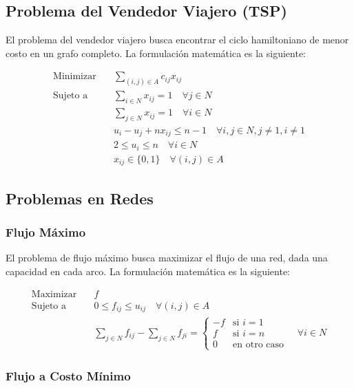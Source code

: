 \documentclass{article}
\begin{document}
\subsection{Problema del Vendedor Viajero (TSP)}

El problema del vendedor viajero busca encontrar el ciclo hamiltoniano de menor costo en un grafo completo. La formulación matemática es la siguiente:

\begin{align*}
    \text{Minimizar} \quad & \sum_{(i, j) \in A} c_{ij} x_{ij} \\
    \text{Sujeto a} \quad & \sum_{i \in N} x_{ij} = 1 \quad \forall j \in N \\
    & \sum_{j \in N} x_{ij} = 1 \quad \forall i \in N \\
    & u_i - u_j + n x_{ij} \leq n - 1 \quad \forall i, j \in N, j \neq 1, i \neq 1 \\
    & 2 \leq u_i \leq n \quad \forall i \in N \\
    & x_{ij} \in \{0, 1\} \quad \forall (i, j) \in A
\end{align*}

\subsection{Problemas en Redes}

\subsubsection{Flujo Máximo}

El problema de flujo máximo busca maximizar el flujo de una red, dada una capacidad en cada arco. La formulación matemática es la siguiente:

\begin{align*}
    \text{Maximizar} \quad & f \\
    \text{Sujeto a} \quad & 0 \leq f_{ij} \leq u_{ij} \quad \forall (i, j) \in A \\
    & \sum_{j \in N} f_{ij} - \sum_{j \in N} f_{ji} = 
    \begin{cases}
        -f & \text{si } i = 1 \\
        f & \text{si } i = n \\
        0 & \text{en otro caso}
    \end{cases} \quad \forall i \in N
\end{align*}

\subsubsection{Flujo a Costo Mínimo}
\end{document}
